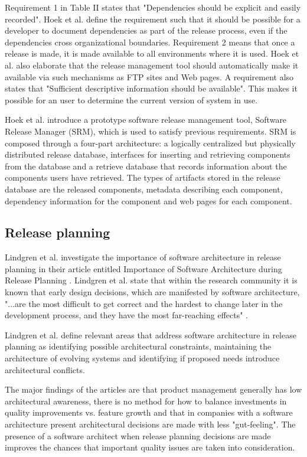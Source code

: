 \documentclass[conference]{IEEEtran}
\begin{document}
Requirement 1 in Table II states that "Dependencies should be explicit and easily recorded". Hoek et al. define the requirement such that it should be possible for a developer to document dependencies as part of the release process, even if the dependencies cross organizational boundaries. Requirement 2 means that once a release is made, it is made available to all environments where it is used. Hoek et al. also elaborate that the release management tool should automatically make it available via such mechanisms as FTP sites and Web pages. A requirement also states that "Sufficient descriptive information should be available". This makes it possible for an user to determine the current version of system in use.

Hoek et al. introduce a prototype software release management tool, Software Release Manager (SRM), which is used to satisfy previous requirements. SRM is composed through a four-part architecture: a logically centralized but physically distributed release database, interfaces for inserting and retrieving components from the database and a retrieve database that records information about the components users have retrieved. The types of artifacts stored in the release database are the released components, metadata describing each component, dependency information for the component and web pages for each component. 

\subsection{Release planning}

Lindgren et al. investigate the importance of software architecture in release planning in their article entitled Importance of Software Architecture during Release Planning \cite{lindgren2008importance}. Lindgren et al. state that within the research community it is known that early design decisions, which are manifested by software architecture, "...are the most difficult to get correct and the hardest to change later in the development process, and they have the most far-reaching effects" \cite{bass2003software}.

Lindgren et al. define relevant areas that address software architecture in release planning as identifying possible architectural constraints, maintaining the architecture of evolving systems and identifying if proposed needs introduce architectural conflicts. 

The major findings of the articles are that product management generally has low architectural awareness, there is no method for how to balance investments in quality improvements vs. feature growth and that in companies with a software architecture present architectural decisions are made with less "gut-feeling". The presence of a software architect when release planning decisions are made improves the chances that important quality issues are taken into consideration.
\end{document}
